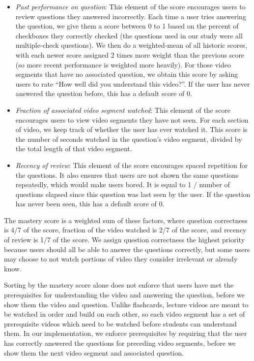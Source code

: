 \documentclass{chi-ext}
\begin{document}
\begin{itemize}
\item \emph{Past performance on question}: This element of the score encourages users to review questions they answered incorrectly. Each time a user tries answering the question, we give them a score between 0 to 1 based on the percent of checkboxes they correctly checked (the questions used in our study were all multiple-check questions). We then do a weighted-mean of all historic scores, with each newer score assigned 2 times more weight than the previous score (so more recent performance is weighted more heavily). For those video segments that have no associated question, we obtain this score by asking users to rate ``How well did you understand this video?''. If the user has never answered the question before, this has a default score of 0.
\item \emph{Fraction of associated video segment watched}: This element of the score encourages users to view video segments they have not seen. For each section of video, we keep track of whether the user has ever watched it. This score is the number of seconds watched in the question's video segment, divided by the total length of that video segment.
\item \emph{Recency of review}:  This element of the score encourages spaced repetition for the questions. It also ensures that users are not shown the same questions repeatedly, which would make users bored. It is equal to 1 / number of questions elapsed since this question was last seen by the user. If the question has never been seen, this has a default score of 0.
\end{itemize}

The mastery score is a weighted sum of these factors, where question correctness is 4/7 of the score, fraction of the video watched is 2/7 of the score, and recency of review is 1/7 of the score. We assign question correctness the highest priority because users should all be able to answer the questions correctly, but some users may choose to not watch portions of video they consider irrelevant or already know.

Sorting by the mastery score alone does not enforce that users have met the prerequisites for understanding the video and answering the question, before we show them the video and question. Unlike flashcards, lecture videos are meant to be watched in order and build on each other, so each video segment has a set of prerequisite videos which need to be watched before students can understand them. In our implementation, we enforce prerequisites by requiring that the user has correctly answered the questions for preceding video segments, before we show them the next video segment and associated question.
\end{document}
